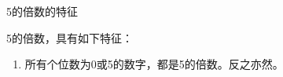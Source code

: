 \documentclass[aspectratio=169]{ctexbeamer} %
\date{\today}
\begin{document}
\begin{frame}[t]{5的倍数的特征}
\begin{spacing}{1.2}
\normalsize
5的倍数，具有如下特征：
\begin{enumerate}[label={\arabic*.}]
\item 所有个位数为0或5的数字，都是5的倍数。反之亦然。
\end{enumerate}

\end{spacing}
\end{frame}
\end{document}
